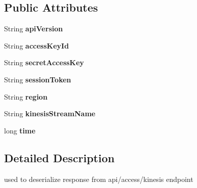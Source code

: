 \subsection*{Public Attributes}
\begin{DoxyCompactItemize}
\item 
String {\bfseries api\+Version}\hypertarget{classMetacogSDK_1_1KinesisResponse_a7cb020e8457a56ea714b904fa16c97ad}{}\label{classMetacogSDK_1_1KinesisResponse_a7cb020e8457a56ea714b904fa16c97ad}

\item 
String {\bfseries access\+Key\+Id}\hypertarget{classMetacogSDK_1_1KinesisResponse_a4826e045c291c68a9271dda0d3899f17}{}\label{classMetacogSDK_1_1KinesisResponse_a4826e045c291c68a9271dda0d3899f17}

\item 
String {\bfseries secret\+Access\+Key}\hypertarget{classMetacogSDK_1_1KinesisResponse_a498923f6ef98a7f312e4e89499c0b4b5}{}\label{classMetacogSDK_1_1KinesisResponse_a498923f6ef98a7f312e4e89499c0b4b5}

\item 
String {\bfseries session\+Token}\hypertarget{classMetacogSDK_1_1KinesisResponse_a6f38ee2b00567d4df0d22eed6c91fc22}{}\label{classMetacogSDK_1_1KinesisResponse_a6f38ee2b00567d4df0d22eed6c91fc22}

\item 
String {\bfseries region}\hypertarget{classMetacogSDK_1_1KinesisResponse_a0d91e5bb5020dd037069b19b7fa5dc3d}{}\label{classMetacogSDK_1_1KinesisResponse_a0d91e5bb5020dd037069b19b7fa5dc3d}

\item 
String {\bfseries kinesis\+Stream\+Name}\hypertarget{classMetacogSDK_1_1KinesisResponse_aafafbf1f2f6f46427d8aaa76c3bc14e6}{}\label{classMetacogSDK_1_1KinesisResponse_aafafbf1f2f6f46427d8aaa76c3bc14e6}

\item 
long {\bfseries time}\hypertarget{classMetacogSDK_1_1KinesisResponse_a616c1e17ebf15225aaa26cd9d8c1f0d3}{}\label{classMetacogSDK_1_1KinesisResponse_a616c1e17ebf15225aaa26cd9d8c1f0d3}

\end{DoxyCompactItemize}


\subsection{Detailed Description}
used to deserialize response from api/access/kinesis endpoint 

